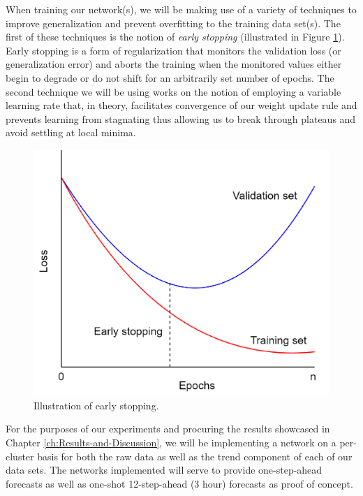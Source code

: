 \begin{adjustwidth}{-1.65cm}{-0.0cm}
\begin{enumerate}[label=Step 4.2.\arabic*:, leftmargin=*]
    \noindent \newline When training our network(s), we will be making use of a variety of techniques to improve generalization and prevent overfitting to the training data set(s). The first of these techniques is the notion of \textit{early stopping} (illustrated in Figure \ref{fig:Early-Stopping}). Early stopping is a form of regularization that monitors the validation loss (or generalization error) and aborts the training when the monitored values either begin to degrade or do not shift for an arbitrarily set number of epochs. The second technique we will be using works on the notion of employing a variable learning rate that, in theory, facilitates convergence of our weight update rule and prevents learning from stagnating thus allowing us to break through plateaus and avoid settling at local minima.
    
    \begin{figure}[H]
        \centering
        \includegraphics[width=\textwidth]{Images/Chapter 6/Stage 4/Other/Early-Stopping.pdf}
        \caption{Illustration of early stopping.}
        \label{fig:Early-Stopping}
    \end{figure}

    \noindent \newline For the purposes of our experiments and procuring the results showcased in Chapter \ref{ch:Results-and-Discussion}, we will be implementing a network on a per-cluster basis for both the raw data as well as the trend component of each of our data sets. The networks implemented will serve to provide one-step-ahead forecasts as well as one-shot 12-step-ahead (3 hour) forecasts as proof of concept.
    

\end{enumerate}
\end{adjustwidth}
